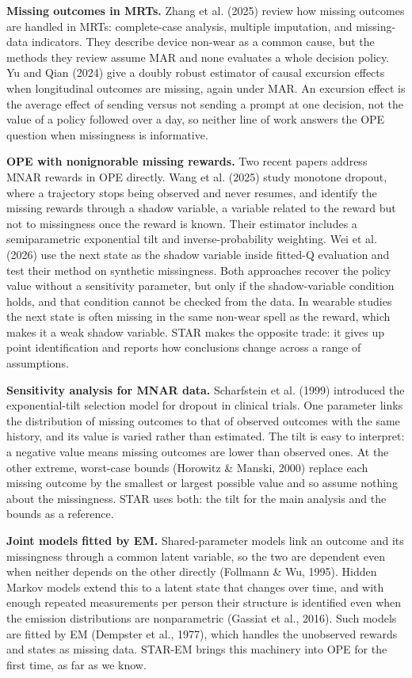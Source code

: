 \documentclass[12pt]{article}
\begin{document}
\textbf{Missing outcomes in MRTs.} Zhang et al. (2025) review how missing outcomes are handled in MRTs: complete-case analysis, multiple imputation, and missing-data indicators. They describe device non-wear as a common cause, but the methods they review assume MAR and none evaluates a whole decision policy. Yu and Qian (2024) give a doubly robust estimator of causal excursion effects when longitudinal outcomes are missing, again under MAR. An excursion effect is the average effect of sending versus not sending a prompt at one decision, not the value of a policy followed over a day, so neither line of work answers the OPE question when missingness is informative.

\textbf{OPE with nonignorable missing rewards.} Two recent papers address MNAR rewards in OPE directly. Wang et al. (2025) study monotone dropout, where a trajectory stops being observed and never resumes, and identify the missing rewards through a shadow variable, a variable related to the reward but not to missingness once the reward is known. Their estimator includes a semiparametric exponential tilt and inverse-probability weighting. Wei et al. (2026) use the next state as the shadow variable inside fitted-Q evaluation and test their method on synthetic missingness. Both approaches recover the policy value without a sensitivity parameter, but only if the shadow-variable condition holds, and that condition cannot be checked from the data. In wearable studies the next state is often missing in the same non-wear spell as the reward, which makes it a weak shadow variable. STAR makes the opposite trade: it gives up point identification and reports how conclusions change across a range of assumptions.

\textbf{Sensitivity analysis for MNAR data.} Scharfstein et al. (1999) introduced the exponential-tilt selection model for dropout in clinical trials. One parameter links the distribution of missing outcomes to that of observed outcomes with the same history, and its value is varied rather than estimated. The tilt is easy to interpret: a negative value means missing outcomes are lower than observed ones. At the other extreme, worst-case bounds (Horowitz \& Manski, 2000) replace each missing outcome by the smallest or largest possible value and so assume nothing about the missingness. STAR uses both: the tilt for the main analysis and the bounds as a reference.

\textbf{Joint models fitted by EM.} Shared-parameter models link an outcome and its missingness through a common latent variable, so the two are dependent even when neither depends on the other directly (Follmann \& Wu, 1995). Hidden Markov models extend this to a latent state that changes over time, and with enough repeated measurements per person their structure is identified even when the emission distributions are nonparametric (Gassiat et al., 2016). Such models are fitted by EM (Dempster et al., 1977), which handles the unobserved rewards and states as missing data. STAR-EM brings this machinery into OPE for the first time, as far as we know.
\end{document}
